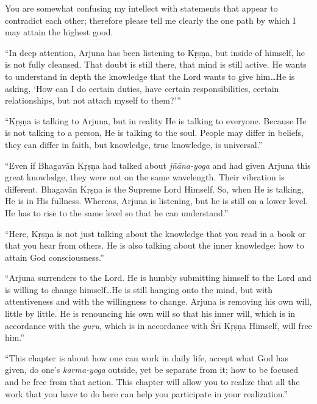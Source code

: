 {You are somewhat confusing my intellect with statements that appear to contradict each other; therefore please tell me clearly the one path by which I may attain the highest good.}


\enquote{In deep attention, Arjuna has been listening to Kṛṣṇa, but inside of himself, he is not fully cleansed. That doubt is still there, that mind is still active. He wants to understand in depth the knowledge that the Lord wants to give him\ldots He is asking, \enquote{How can I do certain duties, have certain responsibilities, certain relationships, but not attach myself to them?}}

\enquote{Kṛṣṇa is talking to Arjuna, but in reality He is talking to everyone. Because He is not talking to a person, He is talking to the soul. People may differ in beliefs, they can differ in faith, but knowledge, true knowledge, is universal.}

\enquote{Even if Bhagavān Kṛṣṇa had talked about \textit{jñāna-yoga} and had given Arjuna this great knowledge, they were not on the same wavelength. Their vibration is different. Bhagavān Kṛṣṇa is the Supreme Lord Himself. So, when He is talking, He is in His fullness. Whereas, Arjuna is listening, but he is still on a lower level. He has to rise to the same level so that he can understand.}

\enquote{Here, Kṛṣṇa is not just talking about the knowledge that you read in a book or that you hear from others. He is also talking about the inner knowledge: how to attain God consciousness.}

\enquote{Arjuna surrenders to the Lord. He is humbly submitting himself to the Lord and is willing to change himself\ldots He is still hanging onto the mind, but with attentiveness and with the willingness to change. Arjuna is removing his own will, little by little. He is renouncing his own will so that his inner will, which is in accordance with the \textit{guru}, which is in accordance with Śrī Kṛṣṇa Himself, will free him.}

\enquote{This chapter is about how one can work in daily life, accept what God has given, do one’s \textit{karma-yoga} outside, yet be separate from it; how to be focused and be free from that action. This chapter will allow you to realize that all the work that you have to do here can help you participate in your realization.}



